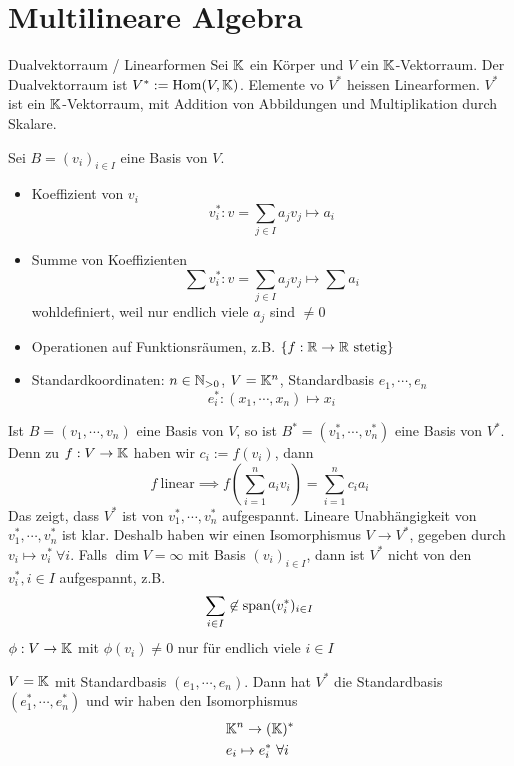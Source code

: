 \section{Multilineare Algebra}
\begin{Def}{Dualvektorraum / Linearformen}
  Sei $\mathbb{K}$ ein Körper und $V$ ein $\mathbb{K}$-Vektorraum. Der Dualvektorraum ist $V^*:=\operatorname{Hom}(V,\mathbb{K})$. Elemente vo $V^*$ heissen Linearformen. $V^*$ ist ein $\mathbb{K}$-Vektorraum, mit Addition von Abbildungen und Multiplikation durch Skalare.
\end{Def}
\begin{Eig}
  Sei $B=(v_i)_{i\in I}$ eine Basis von $V$.
  \begin{itemize}
    \item Koeffizient von $v_i$
      \[v_i^*:v=\sum_{j\in I}a_jv_j\mapsto a_i\]
    \item Summe von Koeffizienten
      \[\sum v_i^*:v=\sum_{j\in I}a_jv_j\mapsto \sum a_i\]
      wohldefiniert, weil nur endlich viele $a_j$ sind $\neq 0$
    \item Operationen auf Funktionsräumen, z.B. $\left\{ f:\mathbb{R}\to \mathbb{R}\ \text{stetig} \right\}$
    \item Standardkoordinaten: $n\in\mathbb{N}_{>0}$, $V=\mathbb{K}^n$, Standardbasis $e_1,\cdots,e_n$
      \[e_i^*:(x_1,\cdots,x_n)\mapsto x_i\]
  \end{itemize}
\end{Eig}
\begin{Bem}
  Ist $B=(v_1,\cdots,v_n)$ eine Basis von $V$, so ist $B^*=(v_1^*,\cdots,v_n^*)$ eine Basis von $V^*$. Denn zu $f:V\to \mathbb{K}$ haben wir $c_i:=f(v_i)$, dann \[f\ \text{linear} \implies f(\sum_{i=1}^na_iv_i)=\sum^n_{i=1}c_ia_i\]
  Das zeigt, dass $V^*$ ist von $v_1^*,\cdots,v_n^*$ aufgespannt. Lineare Unabhängigkeit von $v_1^*,\cdots,v_n^*$ ist klar. Deshalb haben wir einen Isomorphismus $V\to V^*$, gegeben durch $v_i\mapsto v_i^*\ \forall i$. Falls $\dim V=\infty$ mit Basis $(v_i)_{i\in I}$, dann ist $V^*$ nicht von den $v_i^*, i\in I$ aufgespannt, z.B.
  \[\sum_{i\in I}\not\in\operatorname{span}(v_i^*)_{i\in I}\]
  $\phi:V\to\mathbb{K}$ mit $\phi(v_i)\neq 0$ nur für endlich viele $i\in I$
\end{Bem}
\begin{Bsp}
  $V=\mathbb{K}$ mit Standardbasis $(e_1,\cdots,e_n)$. Dann hat $V^*$ die Standardbasis $(e_1^*,\cdots,e_n^*)$ und wir haben den Isomorphismus
  \begin{align*}
    &\mathbb{K}^n\to(\mathbb{K})^*\\
    &e_i\mapsto e^*_i\ \forall i
  \end{align*}
\end{Bsp}
